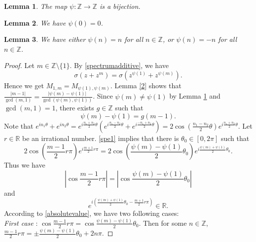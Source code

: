 \documentclass[10pt,a4paper]{amsart}
\newtheorem{lemma}{Lemma}
\begin{document}
\begin{lemma}\label{B1}
The map $\psi:\mathbb{Z} \to \mathbb{Z}$ is a bijection.
\end{lemma}

\begin{lemma}\label{p0}
We have $\psi(0)=0$. 
\end{lemma}

\begin{lemma}\label{psi} 
We have either $\psi(n)=n$ for all $n \in \mathbb{Z}$, or $\psi(n)=-n$ for all $n \in \mathbb{Z}$. 
\end{lemma}

\begin{proof}
Let $m \in \mathbb{Z}\setminus \{1\}$. By \eqref{spectrumadditive}, we have 
\begin{equation}\label{spe1}
\sigma(z+z^{m})=\sigma(z^{\psi(1)}+z^{\psi(m)}).
\end{equation}
Hence we get $M_{1,m}=M_{\psi(1),\psi(m)}$. Lemma \ref{2} shows that $\frac{|m-1|}{\operatorname{gcd}(m,1)}=\frac{|\psi(m)-\psi(1)|}{\operatorname{gcd}(\psi(m),\psi(1))}$. Since $\psi(m) \neq \psi(1)$ by Lemma \ref{B1} and $\operatorname{gcd}(m,1)=1$, there exists $g \in \mathbb{Z}$ such that 
\begin{equation}\label{gcd1}
\psi(m)-\psi(1)=g(m-1).
\end{equation}
Note that $e^{in_1\theta}+e^{in_2\theta}=e^{i\frac{n_1+n_2}{2}\theta}(e^{i\frac{n_1-n_2}{2}\theta}+e^{i\frac{-n_1+n_2}{2}\theta})=2\cos(\frac{n_1-n_2}{2}\theta) e^{i\frac{n_1+n_2}{2}\theta}$. Let $r \in \mathbb{R}$ be an irrational number.  \eqref{spe1} implies that there is $\theta_0 \in [0, 2\pi]$ such that 
\[
2 \cos \left(\frac{m-1}{2} r\pi \right) e^{i\frac{m+1}{2}r \pi}=2 \cos \left(\frac{\psi(m)-\psi(1)}{2} \theta_0 \right) e^{i\frac{\psi(m)+\psi(1)}{2}\theta_0}.
\]
Thus we have
\begin{equation}\label{absolutevalue}
\left|\cos \frac{m-1}{2} r\pi \right|=\left| \cos \frac{\psi(m)-\psi(1)}{2} \theta_0 \right|
\end{equation}
and 
\begin{equation}\label{argument}
e^{i(\frac{\psi(m)+\psi(1)}{2}\theta_0-\frac{m+1}{2}r \pi)} \in \mathbb{R}.
\end{equation}
According to \eqref{absolutevalue},  we have two following cases:\\
{\it{First case} }: $\cos \frac{m-1}{2} r\pi = \cos \frac{\psi(m)-\psi(1)}{2} \theta_0$. Then for some $n \in \mathbb{Z}$,
$\frac{m-1}{2} r\pi =\pm \frac{\psi(m)-\psi(1)}{2} \theta_0+2n\pi$.

\end{proof}
\end{document}
